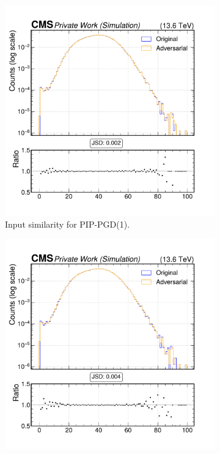\begin{figure}[h]
  \centering
  \begin{subfigure}[t]{0.32\textwidth}
    \includegraphics[width=\linewidth]{media/output/features/compare/combined_it_1/cmp_global_features_npv.pdf}
    \caption*{Input similarity for PIP-PGD(1).}
  \end{subfigure}\hfill
  \begin{subfigure}[t]{0.32\textwidth}
    \includegraphics[width=\linewidth]{media/output/features/compare/combined_it_2/cmp_global_features_npv.pdf}

\end{subfigure}
\end{figure}
